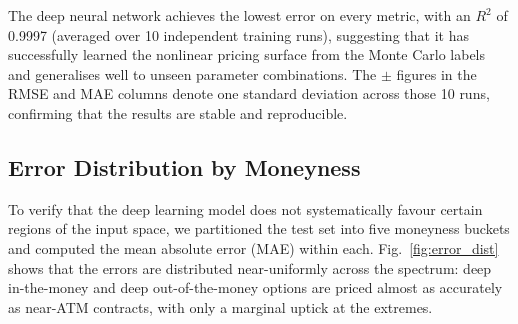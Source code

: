 \documentclass[conference]{IEEEtran}
\begin{document}
\begin{table}[htbp]
\caption{Accuracy Comparison of Pricing Methods}
\label{tab:accuracy}
\centering
\small
\setlength{\tabcolsep}{4pt}
\renewcommand{\arraystretch}{1.05}
\end{table}

The deep neural network achieves the lowest error on every metric, with an $R^2$ of 0.9997 (averaged over 10 independent training runs), suggesting that it has successfully learned the nonlinear pricing surface from the Monte Carlo labels and generalises well to unseen parameter combinations. The $\pm$ figures in the RMSE and MAE columns denote one standard deviation across those 10 runs, confirming that the results are stable and reproducible.

\subsection{Error Distribution by Moneyness}

To verify that the deep learning model does not systematically favour certain regions of the input space, we partitioned the test set into five moneyness buckets and computed the mean absolute error (MAE) within each. Fig.~\ref{fig:error_dist} shows that the errors are distributed near-uniformly across the spectrum: deep in-the-money and deep out-of-the-money options are priced almost as accurately as near-ATM contracts, with only a marginal uptick at the extremes.
\end{document}
